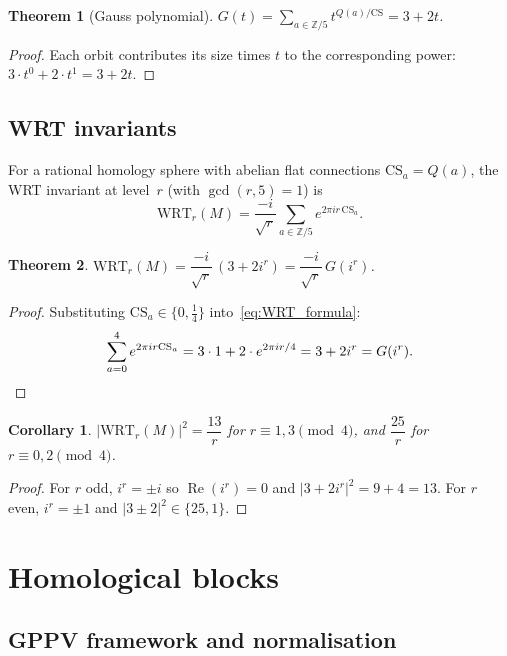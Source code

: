 \documentclass[11pt,a4paper]{article}
\newtheorem{theorem}{Theorem}
\newtheorem{corollary}{Corollary}
\theoremstyle{definition}
\theoremstyle{remark}
\newcommand{\Z}{\mathbb{Z}}
\newcommand{\CS}{\mathrm{CS}}
\newcommand{\WRT}{\mathrm{WRT}}
\begin{document}
\begin{theorem}[Gauss polynomial]\label{thm:gauss}
$\displaystyle G(t)=\sum_{a\in\Z/5}t^{Q(a)/\CS}=3+2t$.
\end{theorem}
\begin{proof}
Each orbit contributes its size times $t$ to the corresponding
power: $3\cdot t^0+2\cdot t^1=3+2t$.
\end{proof}

\subsection{WRT invariants}

For a rational homology sphere with abelian flat connections
$\CS_a=Q(a)$, the WRT invariant at level~$r$
(with $\gcd(r,5)=1$) is~\cite{GPPV,FreedGompf}
\begin{equation}\label{eq:WRT_formula}
\WRT_r(M)=\frac{-i}{\sqrt{r}}\sum_{a\in\Z/5}e^{2\pi i r\,\CS_a}.
\end{equation}

\begin{theorem}\label{thm:wrt}
$\displaystyle\WRT_r(M)
=\dfrac{-i}{\sqrt{r}}\,(3+2i^r)
=\dfrac{-i}{\sqrt{r}}\,G(i^r)$.
\end{theorem}
\begin{proof}
Substituting $\CS_a\in\{0,\tfrac{1}{4}\}$ into~\eqref{eq:WRT_formula}:
\[
\sum_{a=0}^{4}e^{2\pi i r\CS_a}
= 3\cdot1+2\cdot e^{2\pi ir/4}
= 3+2i^r = G(i^r). \qedhere
\]
\end{proof}

\begin{corollary}\label{cor:norm}
$|\WRT_r(M)|^2=\dfrac{13}{r}$ for $r\equiv1,3\pmod4$,
and $\dfrac{25}{r}$ for $r\equiv0,2\pmod4$.
\end{corollary}
\begin{proof}
For $r$ odd, $i^r=\pm i$ so $\operatorname{Re}(i^r)=0$ and
$|3+2i^r|^2=9+4=13$.
For $r$ even, $i^r=\pm1$ and $|3\pm2|^2\in\{25,1\}$.
\end{proof}

\section{Homological blocks}
\label{sec:blocks}

\subsection{GPPV framework and normalisation}
\end{document}
